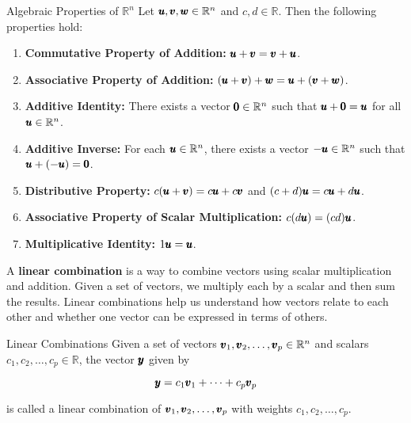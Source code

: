\begin{custombox}{Algebraic Properties of $\mathbb{R}^n$}
    Let $\pmb{u}, \pmb{v}, \pmb{w} \in \mathbb{R}^n$ and $c, d \in \mathbb{R}$. Then the following properties hold:
    \begin{enumerate}
        \item \textbf{Commutative Property of Addition:} $\pmb{u} + \pmb{v} = \pmb{v} + \pmb{u}$.
        \item \textbf{Associative Property of Addition:} $(\pmb{u} + \pmb{v}) + \pmb{w} = \pmb{u} + (\pmb{v} + \pmb{w})$.
        \item \textbf{Additive Identity:} There exists a vector $\pmb{0} \in \mathbb{R}^n$ such that $\pmb{u} + \pmb{0} = \pmb{u}$ for all $\pmb{u} \in \mathbb{R}^n$.
        \item \textbf{Additive Inverse:} For each $\pmb{u} \in \mathbb{R}^n$, there exists a vector $-\pmb{u} \in \mathbb{R}^n$ such that $\pmb{u} + (-\pmb{u}) = \pmb{0}$.
        \item \textbf{Distributive Property:} $c(\pmb{u} + \pmb{v}) = c\pmb{u} + c\pmb{v}$ and $(c + d)\pmb{u} = c\pmb{u} + d\pmb{u}$.
        \item \textbf{Associative Property of Scalar Multiplication:} $c(d\pmb{u}) = (cd)\pmb{u}$.
        \item \textbf{Multiplicative Identity:} $1\pmb{u} = \pmb{u}$.
    \end{enumerate}  
\end{custombox}

A \textbf{linear combination} is a way to combine vectors using scalar multiplication and addition. Given a set of vectors, we multiply each by a scalar and then sum the results. Linear combinations help us understand how vectors relate to each other and whether one vector can be expressed in terms of others.

\begin{definition}{Linear Combinations}
    Given a set of vectors $\pmb{v}_1, \pmb{v}_2, \ldots, \pmb{v}_p \in \mathbb{R}^n$ and scalars $c_1, c_2, \ldots, c_p \in \mathbb{R}$, the vector $\pmb{y}$ given by

\[
\pmb{y} = c_1 \pmb{v}_1 + \cdots + c_p \pmb{v}_p
\]

is called a linear combination of $\pmb{v}_1, \pmb{v}_2, \ldots, \pmb{v}_p$ with weights $c_1, c_2, \ldots, c_p$.

\end{definition}

